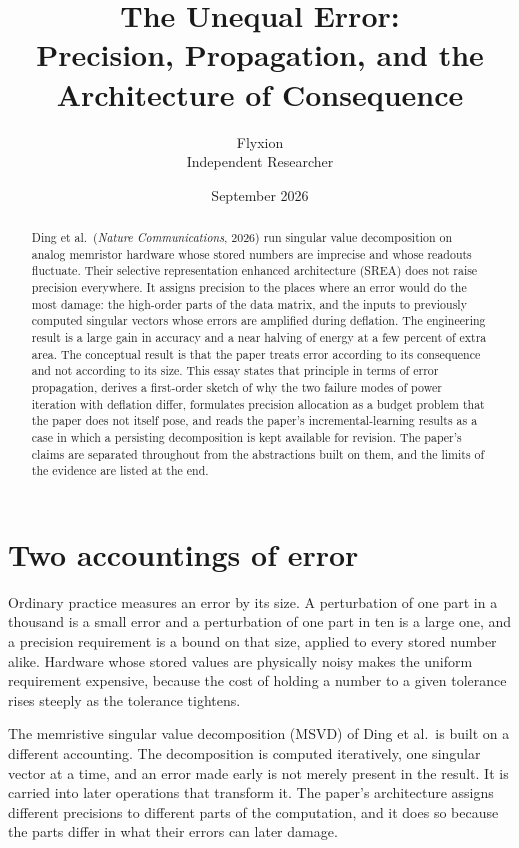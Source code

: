 \documentclass[11pt]{article}
\title{The Unequal Error:\\
Precision, Propagation, and the Architecture of Consequence}
\author{Flyxion\\\small Independent Researcher}
\date{September 2026}
\theoremstyle{definition}
\theoremstyle{remark}
\begin{document}
\maketitle

\begin{abstract}
\noindent
Ding et al.\ (\textit{Nature Communications}, 2026) run singular value decomposition on analog memristor hardware whose stored numbers are imprecise and whose readouts fluctuate. Their selective representation enhanced architecture (SREA) does not raise precision everywhere. It assigns precision to the places where an error would do the most damage: the high-order parts of the data matrix, and the inputs to previously computed singular vectors whose errors are amplified during deflation. The engineering result is a large gain in accuracy and a near halving of energy at a few percent of extra area. The conceptual result is that the paper treats error according to its consequence and not according to its size. This essay states that principle in terms of error propagation, derives a first-order sketch of why the two failure modes of power iteration with deflation differ, formulates precision allocation as a budget problem that the paper does not itself pose, and reads the paper's incremental-learning results as a case in which a persisting decomposition is kept available for revision. The paper's claims are separated throughout from the abstractions built on them, and the limits of the evidence are listed at the end.
\end{abstract}

\section{Two accountings of error}

Ordinary practice measures an error by its size. A perturbation of one part in a thousand is a small error and a perturbation of one part in ten is a large one, and a precision requirement is a bound on that size, applied to every stored number alike. Hardware whose stored values are physically noisy makes the uniform requirement expensive, because the cost of holding a number to a given tolerance rises steeply as the tolerance tightens.

The memristive singular value decomposition (MSVD) of Ding et al.\ is built on a different accounting. The decomposition is computed iteratively, one singular vector at a time, and an error made early is not merely present in the result. It is carried into later operations that transform it. The paper's architecture assigns different precisions to different parts of the computation, and it does so because the parts differ in what their errors can later damage.
\end{document}
